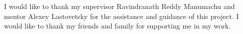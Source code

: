 I would like to thank my supervisor Ravindranath Reddy Manumachu and mentor Alexey Lastovetsky for the assistance and guidance of this project. I would like to thank my friends and family for supporting me in my work.